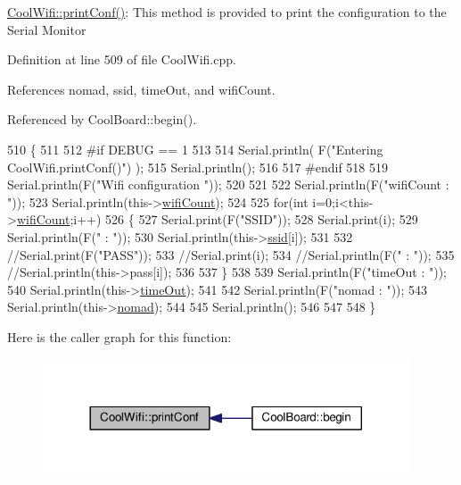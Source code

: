 \hyperlink{classCoolWifi_a9e6105c6d13d35ec510f6633da9e0223}{Cool\+Wifi\+::print\+Conf()}\+: This method is provided to print the configuration to the Serial Monitor 

Definition at line 509 of file Cool\+Wifi.\+cpp.



References nomad, ssid, time\+Out, and wifi\+Count.



Referenced by Cool\+Board\+::begin().


\begin{DoxyCode}
510 \{
511 
512 \textcolor{preprocessor}{#if DEBUG == 1 }
513 
514     Serial.println( F(\textcolor{stringliteral}{"Entering CoolWifi.printConf()"}) );
515     Serial.println();   
516 
517 \textcolor{preprocessor}{#endif}
518     
519     Serial.println(F(\textcolor{stringliteral}{"Wifi configuration "}));
520 
521     
522     Serial.println(F(\textcolor{stringliteral}{"wifiCount : "}));
523     Serial.println(this->\hyperlink{classCoolWifi_ab133bd92fcb895b884deecd6678592e4}{wifiCount});
524     
525     \textcolor{keywordflow}{for}(\textcolor{keywordtype}{int} i=0;i<this->\hyperlink{classCoolWifi_ab133bd92fcb895b884deecd6678592e4}{wifiCount};i++)
526     \{   
527         Serial.print(F(\textcolor{stringliteral}{"SSID"}));
528         Serial.print(i);
529         Serial.println(F(\textcolor{stringliteral}{" : "}));
530         Serial.println(this->\hyperlink{classCoolWifi_a893b21d0fed821438733bba2e73fb4c2}{ssid}[i]);
531                 
532         \textcolor{comment}{//Serial.print(F("PASS"));}
533         \textcolor{comment}{//Serial.print(i);}
534         \textcolor{comment}{//Serial.println(F(" : "));}
535         \textcolor{comment}{//Serial.println(this->pass[i]);}
536         
537     \}
538     
539     Serial.println(F(\textcolor{stringliteral}{"timeOut : "}));
540     Serial.println(this->\hyperlink{classCoolWifi_a952111605f25156588b5632caaba1c6f}{timeOut});
541 
542     Serial.println(F(\textcolor{stringliteral}{"nomad : "}));
543     Serial.println(this->\hyperlink{classCoolWifi_ab7d9643c4af7bac3be331ef008b2ea27}{nomad});
544 
545     Serial.println();
546 
547 
548 \}
\end{DoxyCode}
Here is the caller graph for this function\+:
\nopagebreak
\begin{figure}[H]
\begin{center}
\leavevmode
\includegraphics[width=308pt]{classCoolWifi_a9e6105c6d13d35ec510f6633da9e0223_icgraph}
\end{center}
\end{figure}
\mbox{\label{classCoolWifi_a1c7b4d82a4098d346e7593dce92039fa}} 
